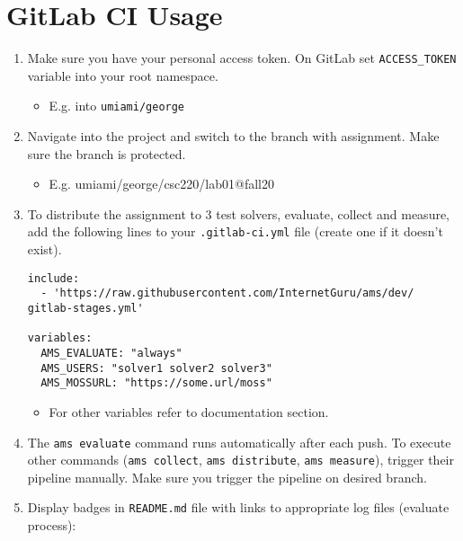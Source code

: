 \section{GitLab CI Usage}\label{gitlab-ci-usage}

\begin{enumerate}
\def\labelenumi{\arabic{enumi}.}
\item
  Make sure you have your personal access token. On GitLab set \texttt{ACCESS\_TOKEN} variable into your root namespace.

  \begin{itemize}
  \item
    E.g. into \texttt{umiami/george}
  \end{itemize}
\item
  Navigate into the project and switch to the branch with assignment. Make sure the branch is protected.

  \begin{itemize}
  \item
    E.g. umiami/george/csc220/lab01@fall20
  \end{itemize}
\item
  To distribute the assignment to 3 test solvers, evaluate, collect and measure, add the following lines to your \texttt{.gitlab-ci.yml} file (create one if it doesn't exist).

\begin{verbatim}
include:
  - 'https://raw.githubusercontent.com/InternetGuru/ams/dev/
gitlab-stages.yml'

variables:
  AMS_EVALUATE: "always"
  AMS_USERS: "solver1 solver2 solver3"
  AMS_MOSSURL: "https://some.url/moss"
\end{verbatim}

  \begin{itemize}
  \item
    For other variables refer to documentation section.
  \end{itemize}
\item
  The \texttt{ams\ evaluate} command runs automatically after each push. To execute other commands (\texttt{ams\ collect}, \texttt{ams\ distribute}, \texttt{ams\ measure}), trigger their pipeline manually. Make sure you trigger the pipeline on desired branch.
\item
  Display badges in \texttt{README.md} file with links to appropriate log files (evaluate process):


\end{enumerate}
